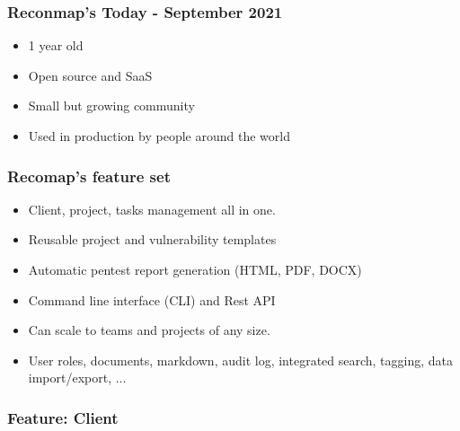 \documentclass{beamer}
\begin{document}
\begin{frame}
	\frametitle{Reconmap's Today - September 2021}
	
	\begin{itemize}
		\item 1 year old
		\item Open source and SaaS
		\item Small but growing community
		\item Used in production by people around the world
	\end{itemize}
\end{frame}

\begin{frame}{}
	\frametitle{Recomap's feature set}
	
    \begin{itemize}
        \item Client, project, tasks management all in one.
        \item Reusable project and vulnerability templates
        \item Automatic pentest report generation (HTML, PDF, DOCX)
        \item Command line interface (CLI) and Rest API
        \item Can scale to teams and projects of any size.
        \item User roles, documents, markdown, audit log, integrated search, tagging, data import/export, ...
    \end{itemize}
\end{frame}

\begin{frame}
	\frametitle{Feature: Client}
\end{frame}
\end{document}
